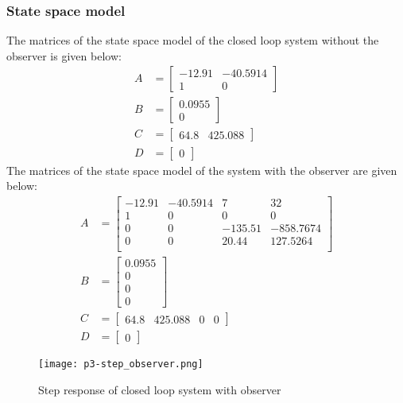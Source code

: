 \subsubsection*{State space model}
The matrices of the state space model of the closed loop system without the observer is given below:
\begin{align*}
	A &= \begin{bmatrix}
		  -12.91 &  -40.5914\\
		1 &  0
	\end{bmatrix}\\
B &= \begin{bmatrix}
	    0.0955\\
	0
\end{bmatrix}\\
C &= \begin{bmatrix}
	64.8 & 425.088
\end{bmatrix}\\
D &= \begin{bmatrix}
	0
\end{bmatrix}
\end{align*}
The matrices of the state space model of the system with the observer are given below:
\begin{align*}
	A &= \begin{bmatrix}
  -12.91 &  -40.5914  &  7 & 32\\
1     &    0    &     0    &     0\\
0    &     0 & -135.51 & -858.7674\\
0      &   0  &  20.44  & 127.5264\\
	\end{bmatrix}\\
	B &= \begin{bmatrix}
		0.0955\\
		0\\0\\0
	\end{bmatrix}\\
	C &= \begin{bmatrix}
		64.8 & 425.088 & 0 & 0
	\end{bmatrix}\\
	D &= \begin{bmatrix}
		0
	\end{bmatrix}
\end{align*}
\begin{figure*}
	\centering
	\texttt{[image: p3-step\_observer.png]}
	\caption{Step response of closed loop system with observer}
	\label{fig:p3:step Gcl observer}
\end{figure*}
